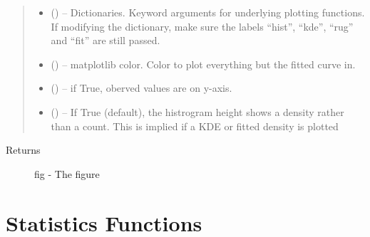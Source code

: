 \documentclass[letterpaper,10pt,english]{sphinxmanual}
\begin{document}
\begin{fulllineitems}
\begin{quote}
\begin{description}
\begin{itemize}
\item {} 
\sphinxstyleliteralstrong{, }\sphinxstyleliteralstrong{, } (\sphinxstyleliteralemphasis{,}\sphinxstyleliteralemphasis{}) -- Dictionaries. Keyword arguments for
underlying plotting functions. If modifying the dictionary, make
sure the labels ``hist'', ``kde'', ``rug'' and ``fit'' are still passed.

\item {} 
 () -- matplotlib color. Color to plot everything but the
fitted curve in.

\item {} 
 () -- if True, oberved values are on y-axis.

\item {} 
 () -- If True (default), the histrogram height shows
a density rather than a count. This is implied if a KDE or
fitted density is plotted

\end{itemize}

\end{description}\end{quote}
\begin{description}
\item[{Returns}] \leavevmode
fig - The figure

\end{description}

\end{fulllineitems}



\chapter{Statistics Functions}
\label{\detokenize{Stats::doc}}\label{\detokenize{Stats:statistics-functions}}
\end{document}
